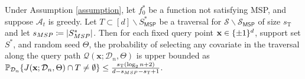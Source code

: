\documentclass[10pt,a4paper]{amsart}
\DeclarePairedDelimiter{\abs}{|}{|}
\DeclarePairedDelimiter{\braces}{\lbrace}{\rbrace}
\newcommand{\MSP}{\textsf{MSP}}
\newcommand{\alg}{\mathcal{A}}
\newcommand{\binspace}{\braces{\pm 1}^\nfeats}
\newcommand{\bx}{\mathbf{x}}
\newcommand{\coordindices}{[\nfeats]}
\newcommand{\data}[1][n]{\mathcal{D}_{#1}}
\newcommand{\fcoefs}{\mathcal{S}}
\newcommand{\nfeats}{d}
\newcommand{\nsamples}{n}
\newcommand{\querypath}{\mathcal{Q}}
\newcommand{\sparsity}{s}
\newcommand{\suppset}{S^*}
\newcommand{\traversalsize}{\sparsity_{\operatorname{T}}}
\newcommand{\traversal}{T}
\renewcommand{\P}{\mathbb{P}}
\begin{document}
\begin{lemma}
    \label{lem:nonmsp_feature_selection_prob}
    Under Assumption \ref{assumption}, let $f_0^*$ be a function not satisfying \MSP, and suppose $\alg_t$ is greedy.
    Let $\traversal \subset \coordindices\backslash\suppset_{\MSP}$ be a traversal for $\fcoefs\backslash\fcoefs_{\MSP}$ of size $\traversalsize$ and let $\sparsity_{\MSP} \coloneqq \abs*{\suppset_{\MSP}}$.
    Then for each fixed query point $\bx \in \binspace$, support set $\suppset$, and random seed $\Theta$, the probability of selecting any covariate in the traversal along the query path $\querypath(\bx;\data,\Theta)$ is upper bounded as $\P_{\data}\braces*{J(\bx;\data,\Theta)\cap \traversal \neq \emptyset } \leq \frac{\traversalsize(\log_2 \nsamples + 2)}{\nfeats - \sparsity_{\MSP}-\traversalsize +1}$.
\end{lemma}
\end{document}
